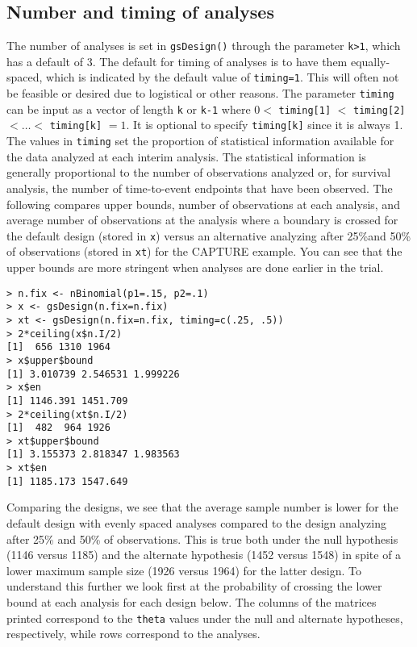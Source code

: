 \subsection{Number and timing of analyses}
The number of analyses is set in \texttt{gsDesign()} through the parameter \texttt{k>1}, which has a default of 3.
The default for timing of analyses is to have them equally-spaced, which is indicated by the default value of \texttt{timing=1}. 
This will often not be feasible or desired due to logistical or other reasons. 
The parameter \texttt{timing} can be input as a vector of length \texttt{k} or \texttt{k-1} where $0<$ \texttt{timing[1]} $<$ \texttt{timing[2]} $<\ldots <$ \texttt{timing[k]} $=1$.
It is optional to specify \texttt{timing[k]} since it is always 1.
The values in \texttt{timing} set the proportion of statistical information available for the data analyzed at each interim analysis.
The statistical information is generally proportional to the number of observations analyzed or, for survival analysis, the number of time-to-event endpoints that have been observed.
The following compares upper bounds, number of observations at each analysis, and average number of observations at the analysis where a boundary is crossed for the default design (stored in \texttt{x}) versus an alternative analyzing after 25\%and 50\% of observations (stored in \texttt{xt}) for the CAPTURE example. 
You can see that the upper bounds are more stringent when analyses are done earlier in the trial.   
\begin{verbatim}
> n.fix <- nBinomial(p1=.15, p2=.1)
> x <- gsDesign(n.fix=n.fix)
> xt <- gsDesign(n.fix=n.fix, timing=c(.25, .5))
> 2*ceiling(x$n.I/2)
[1]  656 1310 1964
> x$upper$bound
[1] 3.010739 2.546531 1.999226
> x$en
[1] 1146.391 1451.709
> 2*ceiling(xt$n.I/2)
[1]  482  964 1926
> xt$upper$bound
[1] 3.155373 2.818347 1.983563
> xt$en
[1] 1185.173 1547.649
\end{verbatim}
Comparing the designs, we see that the average sample number is lower for the default design with evenly spaced analyses compared to the design analyzing after 25\% and 50\% of observations. 
This is true both under the null hypothesis (1146 versus 1185) and the alternate hypothesis (1452 versus 1548) in spite of a lower maximum sample size (1926 versus 1964) for the latter design.   
To understand this further we look first at the probability of crossing the lower bound at each analysis for each design below.
The columns of the matrices printed correspond to the \texttt{theta} values under the null and alternate hypotheses, respectively, while rows correspond to the analyses. 
